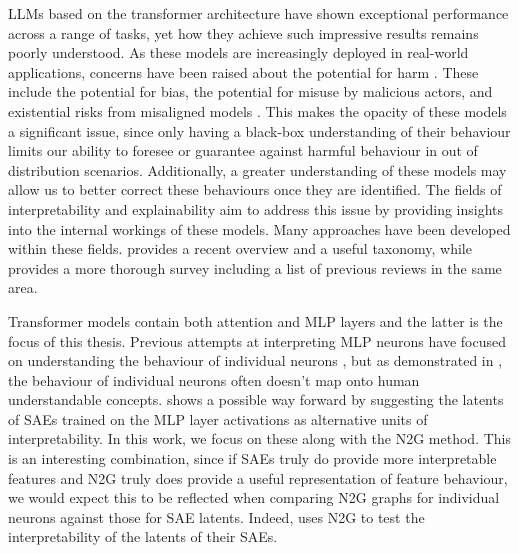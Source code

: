 \Acp{LLM} based on the transformer architecture \parencite{vaswani_attention_2023} have shown exceptional performance across a range of tasks, yet how they achieve such impressive results remains poorly understood.
As these models are increasingly deployed in real-world applications, concerns have been raised about the potential for harm \parencite{noauthor_statement_nodate}\parencite{hendrycks_overview_2023}.
These include the potential for bias, the potential for misuse by malicious actors, and existential risks from misaligned models \parencite{ngo_alignment_2024}.
This makes the opacity of these models a significant issue, since only having a black-box understanding of their behaviour limits our ability to foresee or guarantee against harmful behaviour in out of distribution scenarios.
Additionally, a greater understanding of these models may allow us to better correct these behaviours once they are identified.
The fields of interpretability and explainability aim to address this issue by providing insights into the internal workings of these models.
Many approaches have been developed within these fields.
\textcite{bereska_mechanistic_2024} provides a recent overview and a useful taxonomy, while \textcite{rauker_toward_2023} provides a more thorough survey including a list of previous reviews in the same area.

Transformer models contain both attention and \ac{MLP} layers and the latter is the focus of this thesis.
Previous attempts at interpreting \ac{MLP} neurons have focused on understanding the behaviour of individual neurons \parencite{wang_interpretability_2022}, but as demonstrated in \textcite{elhage_toy_2022}, the behaviour of individual neurons often doesn't map onto human understandable concepts.
\textcite{bricken_towards_2023} shows a possible way forward by suggesting the latents of \acp{SAE} trained on the \ac{MLP} layer activations as alternative units of interpretability.
In this work, we focus on these along with the \ac{N2G} \parencite{foote_neuron_2023} method.
This is an interesting combination, since if \acp{SAE} truly do provide more interpretable features and \ac{N2G} truly does provide a useful representation of feature behaviour, we would expect this to be reflected when comparing \ac{N2G} graphs for individual neurons against those for \ac{SAE} latents.
Indeed, \textcite{gao_scaling_2024} uses \ac{N2G} to test the interpretability of the latents of their \acp{SAE}.

